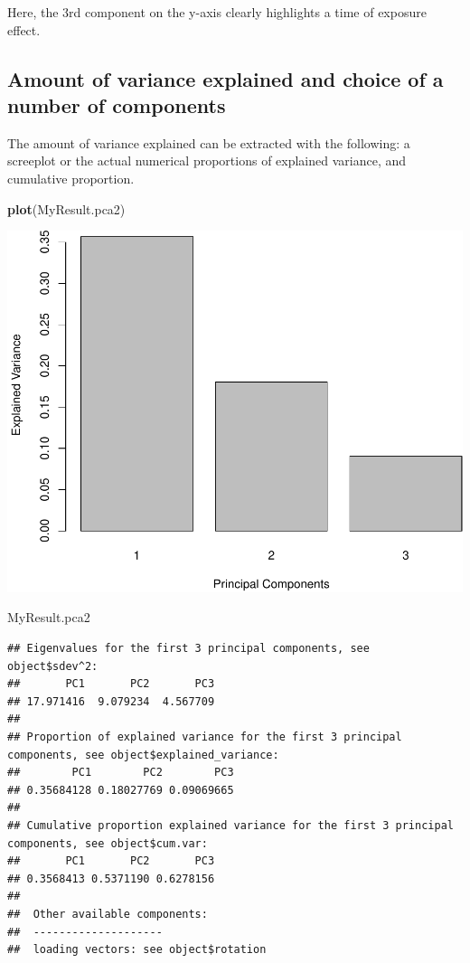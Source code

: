 \documentclass[]{book}
\newenvironment{Shaded}{\begin{snugshade}}{\end{snugshade}}
\newcommand{\KeywordTok}[1]{\textcolor[rgb]{0.13,0.29,0.53}{\textbf{#1}}}
\newcommand{\NormalTok}[1]{#1}
\begin{document}
Here, the 3rd component on the y-axis clearly highlights a time of exposure effect.

\hypertarget{amount-of-variance-explained-and-choice-of-a-number-of-components}{%
\subsection{Amount of variance explained and choice of a number of components}\label{amount-of-variance-explained-and-choice-of-a-number-of-components}}

The amount of variance explained can be extracted with the following: a screeplot or the actual numerical proportions of explained variance, and cumulative proportion.

\begin{Shaded}
\begin{Highlighting}[]
\KeywordTok{plot}\NormalTok{(MyResult.pca2)}
\end{Highlighting}
\end{Shaded}

\begin{center}\includegraphics[width=0.5\linewidth,]{Figures/03-pca-liver-2-plot-1} \end{center}

\begin{Shaded}
\begin{Highlighting}[]
\NormalTok{MyResult.pca2}
\end{Highlighting}
\end{Shaded}

\begin{verbatim}
## Eigenvalues for the first 3 principal components, see object$sdev^2: 
##       PC1       PC2       PC3 
## 17.971416  9.079234  4.567709 
## 
## Proportion of explained variance for the first 3 principal components, see object$explained_variance: 
##        PC1        PC2        PC3 
## 0.35684128 0.18027769 0.09069665 
## 
## Cumulative proportion explained variance for the first 3 principal components, see object$cum.var: 
##       PC1       PC2       PC3 
## 0.3568413 0.5371190 0.6278156 
## 
##  Other available components: 
##  -------------------- 
##  loading vectors: see object$rotation
\end{verbatim}
\end{document}
